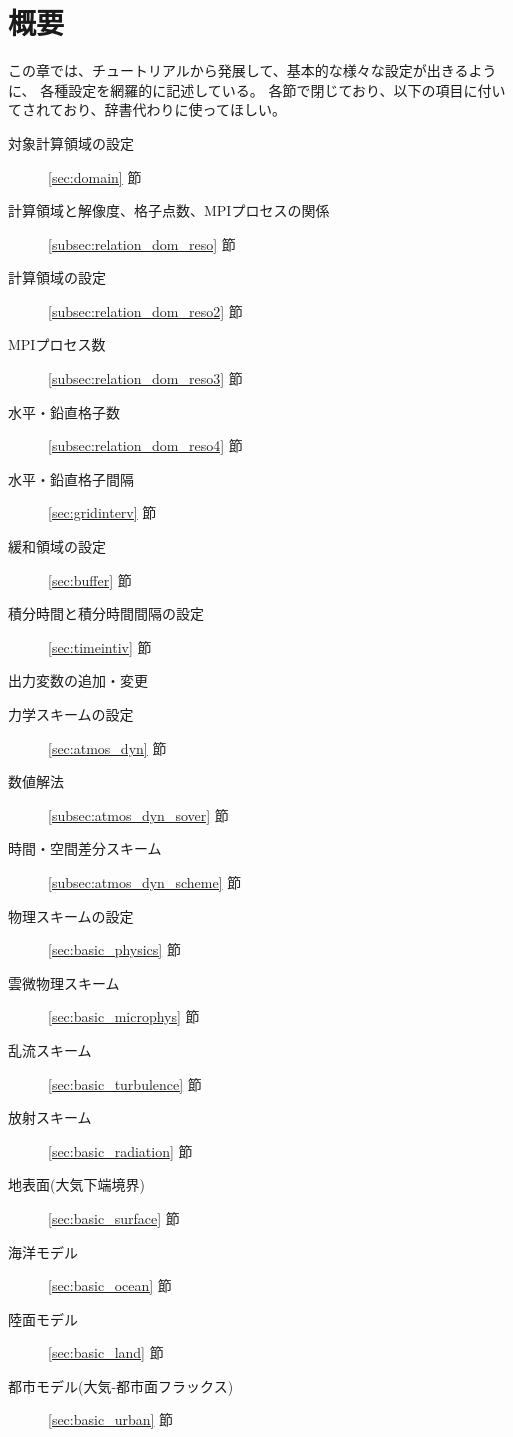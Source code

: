 \section{概要}

この章では、チュートリアルから発展して、基本的な様々な設定が出きるように、
各種設定を網羅的に記述している。
各節で閉じており、以下の項目に付いてされており、辞書代わりに使ってほしい。

{\small
\begin{description}
\item[対象計算領域の設定] \ref{sec:domain} 節
\item[計算領域と解像度、格子点数、MPIプロセスの関係] \ref{subsec:relation_dom_reso} 節
\item[計算領域の設定] \ref{subsec:relation_dom_reso2} 節
\item[MPIプロセス数] \ref{subsec:relation_dom_reso3} 節
\item[水平・鉛直格子数] \ref{subsec:relation_dom_reso4} 節
\item[水平・鉛直格子間隔] \ref{sec:gridinterv} 節
\item[緩和領域の設定] \ref{sec:buffer} 節
\item[積分時間と積分時間間隔の設定] \ref{sec:timeintiv} 節
\item[出力変数の追加・変更] \label{sec:output}
\item[力学スキームの設定] \ref{sec:atmos_dyn} 節
\item[数値解法]  \ref{subsec:atmos_dyn_sover} 節
\item[時間・空間差分スキーム] \ref{subsec:atmos_dyn_scheme} 節
\item[物理スキームの設定] \ref{sec:basic_physics} 節
\item[雲微物理スキーム] \ref{sec:basic_microphys} 節
\item[乱流スキーム] \ref{sec:basic_turbulence} 節
\item[放射スキーム] \ref{sec:basic_radiation} 節
\item[地表面(大気下端境界)] \ref{sec:basic_surface} 節
\item[海洋モデル] \ref{sec:basic_ocean} 節
\item[陸面モデル] \ref{sec:basic_land} 節
\item[都市モデル(大気-都市面フラックス)] \ref{sec:basic_urban} 節
\end{description}
}
